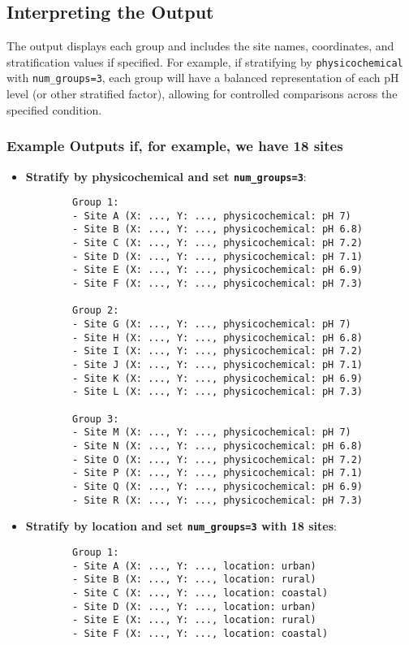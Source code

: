 \documentclass{article}
\begin{document}
	\subsection{Interpreting the Output}
	The output displays each group and includes the site names, coordinates, and stratification values if specified. For example, if stratifying by \texttt{physicochemical} with \texttt{num\_groups=3}, each group will have a balanced representation of each pH level (or other stratified factor), allowing for controlled comparisons across the specified condition.
	
\subsubsection*{Example Outputs \dotfill if, for example, we have 18 sites}
\begin{itemize}
	\item \textbf{Stratify by physicochemical and set \texttt{num\_groups=3}}:
	\begin{verbatim}
		Group 1:
		- Site A (X: ..., Y: ..., physicochemical: pH 7)
		- Site B (X: ..., Y: ..., physicochemical: pH 6.8)
		- Site C (X: ..., Y: ..., physicochemical: pH 7.2)
		- Site D (X: ..., Y: ..., physicochemical: pH 7.1)
		- Site E (X: ..., Y: ..., physicochemical: pH 6.9)
		- Site F (X: ..., Y: ..., physicochemical: pH 7.3)
		
		Group 2:
		- Site G (X: ..., Y: ..., physicochemical: pH 7)
		- Site H (X: ..., Y: ..., physicochemical: pH 6.8)
		- Site I (X: ..., Y: ..., physicochemical: pH 7.2)
		- Site J (X: ..., Y: ..., physicochemical: pH 7.1)
		- Site K (X: ..., Y: ..., physicochemical: pH 6.9)
		- Site L (X: ..., Y: ..., physicochemical: pH 7.3)
		
		Group 3:
		- Site M (X: ..., Y: ..., physicochemical: pH 7)
		- Site N (X: ..., Y: ..., physicochemical: pH 6.8)
		- Site O (X: ..., Y: ..., physicochemical: pH 7.2)
		- Site P (X: ..., Y: ..., physicochemical: pH 7.1)
		- Site Q (X: ..., Y: ..., physicochemical: pH 6.9)
		- Site R (X: ..., Y: ..., physicochemical: pH 7.3)
	\end{verbatim}
	
	\item \textbf{Stratify by location and set \texttt{num\_groups=3} with 18 sites}:
	\begin{verbatim}
		Group 1:
		- Site A (X: ..., Y: ..., location: urban)
		- Site B (X: ..., Y: ..., location: rural)
		- Site C (X: ..., Y: ..., location: coastal)
		- Site D (X: ..., Y: ..., location: urban)
		- Site E (X: ..., Y: ..., location: rural)
		- Site F (X: ..., Y: ..., location: coastal)
		

\end{verbatim}
\end{itemize}
\end{document}
